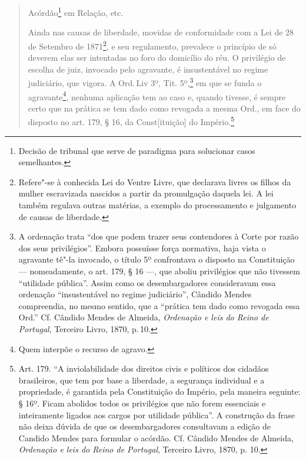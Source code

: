 \begin{quote}
Acórdão\footnote{Decisão de tribunal que serve de paradigma para
  solucionar casos semelhantes.} em Relação, etc.


Ainda nas causas de liberdade, movidas de conformidade com a Lei de 28
de Setembro de 1871\footnote{Refere"-se à conhecida Lei do Ventre
  Livre, que declarava livres os filhos da mulher escravizada nascidos a
  partir da promulgação daquela lei. A lei também regulava outras
  matérias, a exemplo do processamento e julgamento de causas de
  liberdade.}, e seu regulamento, prevalece o princípio de só deverem
elas ser intentadas no foro do domicílio do réu. O privilégio de escolha
de juiz, invocado pelo agravante, é insustentável no regime judiciário,
que vigora. A Ord.\,Liv 3º, Tit. 5º,\footnote{A ordenação trata ``dos
  que podem trazer seus contendores à Corte por razão dos seus
  privilégios''. Embora possuísse força normativa, haja vista o agravante
  tê"-la invocado, o título 5º confrontava o disposto na Constituição ---
  nomeadamente, o art. 179, § 16 ---, que aboliu privilégios que não
  tivessem ``utilidade pública''. Assim como os desembargadores
  consideravam essa ordenação ``insustentável no regime judiciário'',
  Cândido Mendes compreendia, no mesmo sentido, que a ``prática tem dado
  como revogada essa Ord.'' Cf. Cândido Mendes de Almeida,
\emph{Ordenação e leis do Reino de Portugal}, Terceiro Livro, 1870, p.\,10.} em
que se funda o agravante\footnote{Quem interpõe o recurso de agravo.},
nenhuma aplicação tem ao caso e, quando tivesse, é sempre certo que na
prática se tem dado como revogada a mesma Ord., em face do disposto no
art. 179, § 16, da Const{[}ituição{]} do Império.\footnote{Art. 179. ``A
  inviolabilidade dos direitos civis e políticos dos cidadãos
  brasileiros, que tem por base a liberdade, a segurança individual e a
  propriedade, é garantida pela Constituição do Império, pela maneira
  seguinte: § 16º. Ficam abolidos todos os privilégios que não forem
  essenciais e inteiramente ligados aos cargos por utilidade pública''. A
  construção da frase não deixa dúvida de que os desembargadores
  consultavam a edição de Candido Mendes para formular o acórdão. Cf. Cândido Mendes de Almeida,
  \emph{Ordenação e leis do Reino de Portugal}, Terceiro Livro, 1870, p. 10.}


\end{quote}
